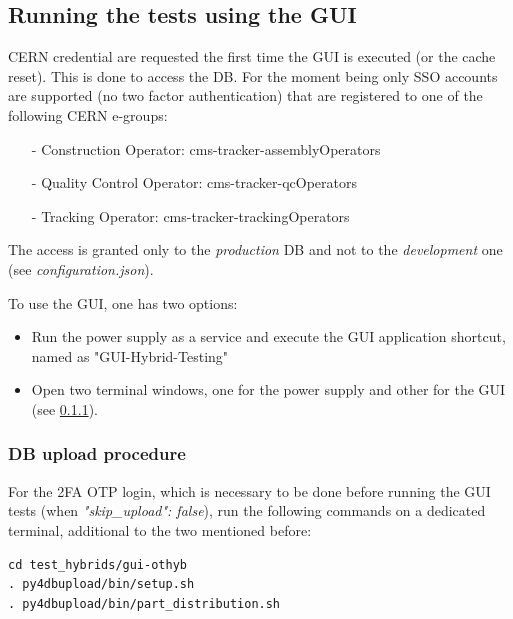 \documentclass[10pt,a4paper]{article}
\begin{document}
\subsection{Running the tests using the GUI}

CERN credential are requested the first time the GUI is executed (or the cache reset). This is done to access the DB. For the moment being only SSO accounts are supported (no two factor authentication) that are registered to one of the following CERN e-groups:
\begin{itemize}
\item[-] Construction Operator: cms-tracker-assemblyOperators
\item[-] Quality Control Operator: cms-tracker-qcOperators
\item[-] Tracking Operator: cms-tracker-trackingOperators
\end{itemize}
The access is granted only to the {\it production} DB and not to the {\it development} one (see \emph{configuration.json}). 

To use the GUI, one has two options:

\begin{itemize}
    \item Run the power supply as a service and execute the GUI application shortcut, named as "GUI-Hybrid-Testing"
    \item Open two terminal windows, one for the power supply and other for the GUI (see \ref{DBup}).
\end{itemize}


\subsubsection{DB upload procedure}
\label{DBup}

For the 2FA OTP login, which is necessary to be done before running the GUI tests (when \emph{"skip\_upload": false}), run the following commands on a dedicated terminal, additional to the two mentioned before:

\begin{framed}
\begin{verbatim}
cd test_hybrids/gui-othyb
. py4dbupload/bin/setup.sh
. py4dbupload/bin/part_distribution.sh
\end{verbatim}
\end{framed}
\end{document}
